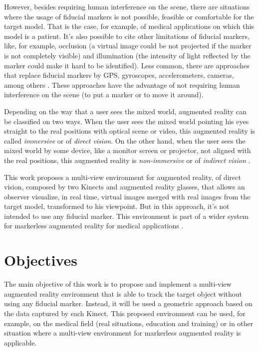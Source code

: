 \documentclass[msc, a4paper, classic, en]{ufbathesis}
\begin{document}
However, besides requiring human interference on the scene, there are situations where the usage of fiducial markers is not possible, feasible or comfortable for the target model. That is the case, for example, of medical applications on which this model is a patient. It's also possible to cite other limitations of fiducial markers, like, for example, occlusion (a virtual image could be not projected if the marker is not completely visible) and illumination (the intensity of light reflected by the marker could make it hard to be identified). Less common, there are approaches that replace fiducial markers \cite{carmigniani} \cite{gallo09} by GPS, gyroscopes, accelerometers, cameras, among others \cite{azuma} \cite{azuma01}. These approaches have the advantage of not requiring human interference on the scene (to put a marker or to move it around).

Depending on the way that a user sees the mixed world, augmented reality can be classified on two ways. When the user sees the mixed world pointing his eyes straight to the real positions with optical scene or video, this augmented reality is called \textit{immersive} or of \textit{direct vision}. On the other hand, when the user sees the mixed world by some device, like a monitor screen or projector, not aligned with the real positions, this augmented reality is \textit{non-immersive} or of \textit{indirect vision} \cite{tori2006fundamentos}.

This work proposes a multi-view environment for augmented reality, of direct vision, composed by two Kinects \cite{kinect} and augmented reality glasses, that allows an observer visualize, in real time, virtual images merged with real images from the target model, transformed to his viewpoint. But in this approach, it's not intended to use any fiducial marker. This environment is part of a wider system for markerless augmented reality for medical applications \cite{wim}.

\section{Objectives}

The main objective of this work is to propose and implement a multi-view augmented reality environment that is able to track the target object without using any fiducial marker. Instead, it will be used a geometric approach based on the data captured by each Kinect. This proposed environment can be used, for example, on the medical field (real situations, education and training) or in other situation where a multi-view environment for markerless augmented reality is applicable. 
\end{document}
